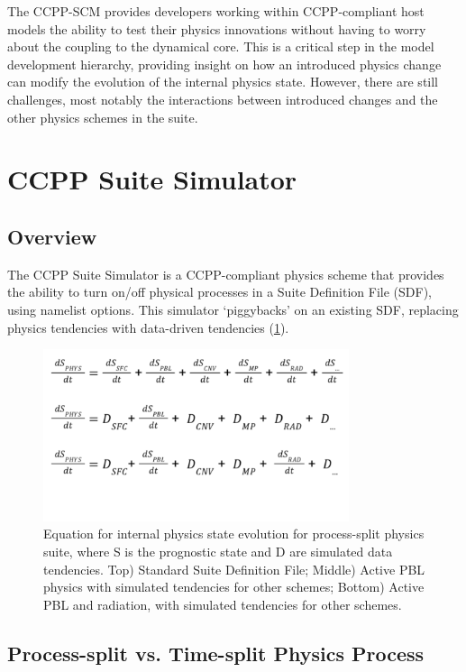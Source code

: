 The CCPP-SCM provides developers working within CCPP-compliant host models the ability to test their physics innovations without having to worry about the coupling to the dynamical core. This is a critical step in the model development hierarchy, providing insight on how an introduced physics change can modify the evolution of the internal physics state. However, there are still challenges, most notably the interactions between introduced changes and the other physics schemes in the suite.

\section{CCPP Suite Simulator}

\subsection{Overview}

The CCPP Suite Simulator is a CCPP-compliant physics scheme that provides the ability to turn on/off physical processes in a Suite Definition File (SDF), using namelist options. This simulator `piggybacks' on an existing SDF, replacing physics tendencies with data-driven tendencies (\ref{fig:CSS_tendency_schematic}). 

\begin{figure}[h]
    \centering
    \includegraphics[width=0.80\textwidth]{images/CSS_tendency_schematic.png}
    \caption{Equation for internal physics state evolution for process-split physics suite, where S is the prognostic state and D are simulated data tendencies. Top) Standard Suite Definition File; Middle) Active PBL physics with simulated tendencies for other schemes; Bottom) Active PBL and radiation, with simulated tendencies for other schemes.}
    \label{fig:CSS_tendency_schematic}
\end{figure}

\subsection{Process-split vs. Time-split Physics Process}

